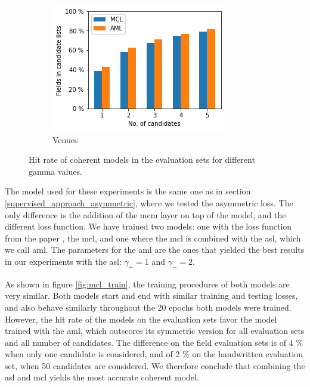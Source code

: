 \begin{figure}
\begin{subfigure}[t]{.32\textwidth}
    \includegraphics[width=\textwidth]{figures/supervised_approach/mcl_venue.png}
    \caption{Venues}
    \label{fig:mcl_venue}
  \end{subfigure}
  \caption{Hit rate of coherent models in the evaluation sets for different gamma values.}
  \label{fig:mcl_eval}
\end{figure}

The model used for these experiments is the same one as in section \ref{supervised_approach_asymmetric}, where we tested the asymmetric loss. The only difference is the addition of the \acrshort{mcm} layer on top of the model, and the different loss function. We have trained two models: one with the loss function from the paper \cite{giunchiglia2020coherent}, the \acrshort{mcl}, and one where the \acrshort{mcl} is combined with the \acrshort{asl}, which we call \acrfull{aml}. The parameters for the \acrshort{aml} are the ones that yielded the best results in our experiments with the \acrshort{asl}: $\gamma_+=1$ and $\gamma_-=2$.

As shown in figure \ref{fig:mcl_train}, the training procedures of both models are very similar. Both models start and end with similar training and testing losses, and also behave similarly throughout the 20 epochs both models were trained. However, the hit rate of the models on the evaluation sets favor the model trained with the \acrshort{aml}, which outscores its symmetric version for all evaluation sets and all number of candidates. The difference on the field evaluation sets is of 4 \% when only one candidate is considered, and of 2 \% on the handwritten evaluation set, when 50 candidates are considered. We therefore conclude that combining the \acrshort{asl} and \acrshort{mcl} yields the most accurate coherent model.